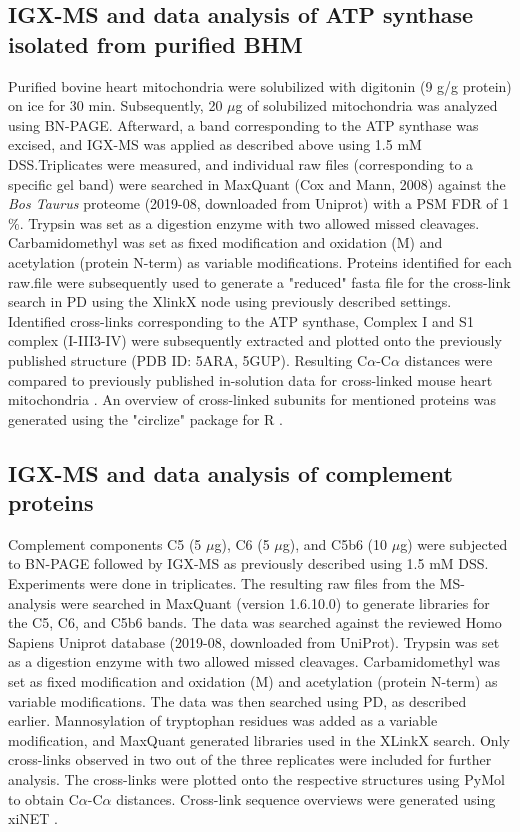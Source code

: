 \subsection*{IGX-MS and data analysis of ATP synthase isolated from purified BHM}
Purified bovine heart mitochondria were solubilized with digitonin (9 g/g protein) on ice for 30 min. Subsequently, 20 $\mu$g of solubilized mitochondria was analyzed using BN-PAGE. Afterward, a band corresponding to the ATP synthase was excised, and IGX-MS was applied as described above using 1.5 mM DSS.Triplicates were measured, and individual raw files (corresponding to a specific gel band) were searched in MaxQuant (Cox and Mann, 2008) against the \emph{Bos Taurus} proteome (2019-08, downloaded from Uniprot) with a PSM FDR of 1 \%. Trypsin was set as a digestion enzyme with two allowed missed cleavages. Carbamidomethyl was set as fixed modification and oxidation (M) and acetylation (protein N-term) as variable modifications. Proteins identified for each raw.file were subsequently used to generate a "reduced" fasta file for the cross-link search in PD using the XlinkX node using previously described settings. Identified cross-links corresponding to the ATP synthase, Complex I and S1 complex (I-III3-IV) were subsequently extracted and plotted onto the previously published structure (PDB ID: 5ARA, 5GUP). Resulting C$\alpha$-C$\alpha$ distances were compared to previously published in-solution data for cross-linked mouse heart mitochondria \cite{Liu_2018}. An overview of cross-linked subunits for mentioned proteins was generated using the "circlize" package for R \cite{Gu_2014}.

\subsection*{IGX-MS and data analysis of complement proteins}
Complement components C5 (5 $\mu$g), C6 (5 $\mu$g), and C5b6 (10 $\mu$g) were subjected to BN-PAGE followed by IGX-MS as previously described using 1.5 mM DSS. Experiments were done in triplicates. The resulting raw files from the MS-analysis were searched in MaxQuant (version 1.6.10.0) to generate libraries for the C5, C6, and C5b6 bands. The data was searched against the reviewed Homo Sapiens Uniprot database (2019-08, downloaded from UniProt). Trypsin was set as a digestion enzyme with two allowed missed cleavages. Carbamidomethyl was set as fixed modification and oxidation (M) and acetylation (protein N-term) as variable modifications. The data was then searched using PD, as described earlier. Mannosylation of tryptophan residues was added as a variable modification, and MaxQuant generated libraries used in the XLinkX search. Only cross-links observed in two out of the three replicates were included for further analysis. The cross-links were plotted onto the respective structures using PyMol to obtain C$\alpha$-C$\alpha$ distances. Cross-link sequence overviews were generated using xiNET \cite{Combe_2015}.

